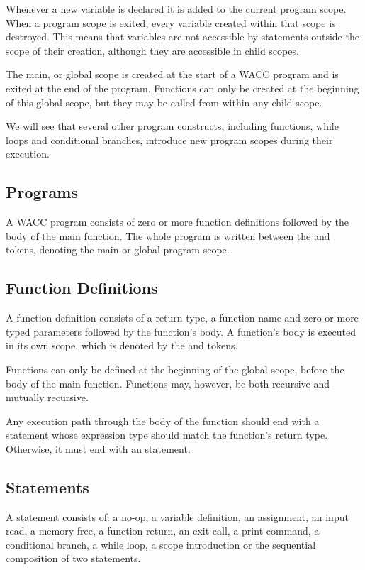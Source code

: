 \documentclass[a4paper]{article}
\theoremstyle{definition}
\begin{document}
Whenever a new variable is declared it is added to the current program scope.
When a program scope is exited, every variable created within that scope is destroyed.
This means that variables are not accessible by statements outside the scope of their creation,
although they are accessible in child scopes.

The main, or global scope is created at the start of a WACC program and is exited at the end of the program.
Functions can only be created at the beginning of this global scope, but they may be called from within any child scope.

We will see that several other program constructs, including functions, while loops and conditional branches, 
introduce new program scopes during their execution.

\subsection{Programs}
A WACC program  consists of zero or more function definitions followed by the body of the main function. 
The whole program is written between the  and  tokens, denoting the main or global program scope.

\subsection{Function Definitions}
A function definition  consists of a return type, a function name 
and zero or more typed parameters followed by the function's body.
A function's body is executed in its own scope, which is denoted by the  and  tokens.

Functions can only be defined at the beginning of the global scope, before the body of the main function.
Functions may, however, be both recursive and mutually recursive.

Any execution path through the body of the function should end with a  statement 
whose expression type should match the function's return type. Otherwise, it must end with an  statement.

\subsection{Statements}
A statement  consists of: 
a no-op,
a variable definition,
an assignment,
an input read,
a memory free,
a function return,
an exit call,
a print command,
a conditional branch,
a while loop,
a scope introduction
or the sequential composition of two statements.
\end{document}

